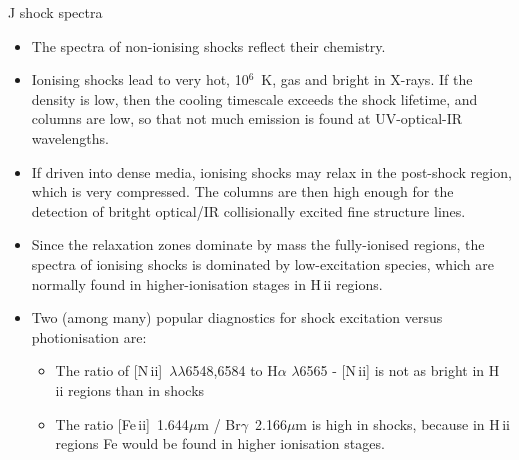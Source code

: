 \begin{frame}{J shock spectra}


\begin{itemize}

\item The spectra of non-ionising shocks reflect their chemistry. 

\item Ionising shocks lead to very hot, 10$^6$~K, gas and bright in
  X-rays. If the density is low, then the cooling timescale exceeds
  the shock lifetime, and columns are low, so that not much emission
  is found at UV-optical-IR wavelengths.

\item If driven into dense media, ionising shocks may relax in the
  post-shock region, which is very compressed. The columns are then
  high enough for the detection of britght optical/IR collisionally
  excited fine structure lines.  

\item Since the relaxation zones dominate by mass the fully-ionised
  regions, the spectra of ionising shocks is dominated by
  low-excitation species, which are normally found in
  higher-ionisation stages in H\,{\sc ii} regions. 

\end{itemize}



\end{frame}





\begin{frame}{}

\begin{itemize}

\item Two (among many) popular diagnostics for shock excitation
  versus photionisation are:

\begin{itemize}
\item The ratio of [N\,{\sc ii}]~$\lambda\lambda$6548,6584 to
  H$\alpha$ $\lambda$6565 - [N\,{\sc ii}] is not as bright in H\,{\sc
    ii} regions than in shocks  
 
\item The ratio [Fe\,{\sc ii}]~1.644$\mu$m / Br$\gamma$~2.166$\mu$m is high in
  shocks, because in H\,{\sc ii} regions Fe would be found in higher
  ionisation stages.


\end{itemize}

\end{itemize}

\end{frame}



